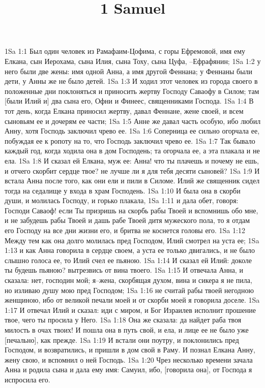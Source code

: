 

\title{1 Samuel}

1Sa 1:1  Был один человек из Рамафаим-Цофима, с горы Ефремовой, имя ему Елкана, сын Иерохама, сына Илия, сына Тоху, сына Цуфа, --Ефрафянин;
1Sa 1:2  у него были две жены: имя одной Анна, а имя другой Феннана; у Феннаны были дети, у Анны же не было детей.
1Sa 1:3  И ходил этот человек из города своего в положенные дни поклоняться и приносить жертву Господу Саваофу в Силом; там [были Илий и] два сына его, Офни и Финеес, священниками Господа.
1Sa 1:4  В тот день, когда Елкана приносил жертву, давал Феннане, жене своей, и всем сыновьям ее и дочерям ее части;
1Sa 1:5  Анне же давал часть особую, ибо любил Анну, хотя Господь заключил чрево ее.
1Sa 1:6  Соперница ее сильно огорчала ее, побуждая ее к ропоту на то, что Господь заключил чрево ее.
1Sa 1:7  Так бывало каждый год, когда ходила она в дом Господень; та огорчала ее, а эта плакала и не ела.
1Sa 1:8  И сказал ей Елкана, муж ее: Анна! что ты плачешь и почему не ешь, и отчего скорбит сердце твое? не лучше ли я для тебя десяти сыновей?
1Sa 1:9  И встала Анна после того, как они ели и пили в Силоме. Илий же священник сидел тогда на седалище у входа в храм Господень.
1Sa 1:10  И была она в скорби души, и молилась Господу, и горько плакала,
1Sa 1:11  и дала обет, говоря: Господи Саваоф! если Ты призришь на скорбь рабы Твоей и вспомнишь обо мне, и не забудешь рабы Твоей и дашь рабе Твоей дитя мужеского пола, то я отдам его Господу на все дни жизни его, и бритва не коснется головы его.
1Sa 1:12  Между тем как она долго молилась пред Господом, Илий смотрел на уста ее;
1Sa 1:13  и как Анна говорила в сердце своем, а уста ее только двигались, и не было слышно голоса ее, то Илий счел ее пьяною.
1Sa 1:14  И сказал ей Илий: доколе ты будешь пьяною? вытрезвись от вина твоего.
1Sa 1:15  И отвечала Анна, и сказала: нет, господин мой; я--жена, скорбящая духом, вина и сикера я не пила, но изливаю душу мою пред Господом;
1Sa 1:16  не считай рабы твоей негодною женщиною, ибо от великой печали моей и от скорби моей я говорила доселе.
1Sa 1:17  И отвечал Илий и сказал: иди с миром, и Бог Израилев исполнит прошение твое, чего ты просила у Него.
1Sa 1:18  Она же сказала: да найдет раба твоя милость в очах твоих! И пошла она в путь свой, и ела, и лице ее не было уже [печально], как прежде.
1Sa 1:19  И встали они поутру, и поклонились пред Господом, и возвратились, и пришли в дом свой в Раму. И познал Елкана Анну, жену свою, и вспомнил о ней Господь.
1Sa 1:20  Чрез несколько времени зачала Анна и родила сына и дала ему имя: Самуил, ибо, [говорила она], от Господа я испросила его.
